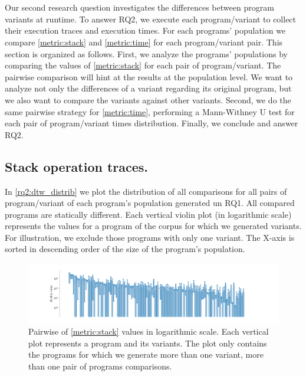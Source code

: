 \section{\rqtwo}



Our second research question investigates the differences between program variants at runtime.
To answer RQ2, we execute each program/variant to collect their execution traces and execution times.
For each programs' population we compare \autoref{metric:stack} and \autoref{metric:time} for each program/variant pair.
This section is organized as follows. First, we analyze the programs' populations by comparing the values of \autoref{metric:stack} for each pair of program/variant. The pairwise comparison will hint at the results at the population level. We want to analyze not only the differences of a variant regarding its original program, but we also want to compare the variants against other variants. Second, we do the same pairwise strategy for \autoref{metric:time}, performing a Mann-Withney U test for each pair of program/variant times distribution. Finally, we conclude and answer RQ2.

\subsection*{Stack operation traces.}

In \autoref{rq2:dtw_distrib} we plot the distribution of all \DTW comparisons for all pairs of program/variant of each program's population generated un RQ1. All compared programs are statically different. Each vertical violin plot (in logarithmic scale) represents the \DTW values for a program of the \corpusrosetta corpus for which we generated variants. For illustration, we exclude those programs with only one variant. The X-axis is sorted in descending order of the size of the program's population. 



\begin{figure}[h]
    \centering
    \hspace*{-0.1\linewidth}\includegraphics[width=1.2\linewidth]{plots/dtw_distrib.pdf}
    \caption{Pairwise of \autoref{metric:stack} values in logarithmic scale. Each vertical plot represents a program and its variants. The plot only contains the programs for which we generate more than one variant, \ie more than one pair of programs comparisons. }
    \label{rq2:dtw_distrib}
\end{figure}

